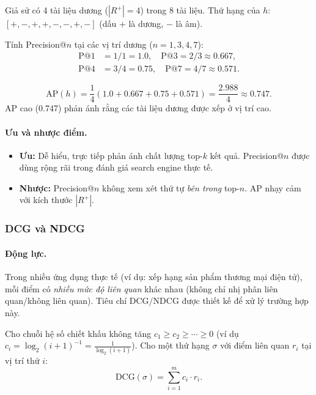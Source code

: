 \begin{example}
Giả sử có 4 tài liệu dương ($|R^+| = 4$) trong 8 tài liệu. Thứ hạng của $h$: $[+, -, +, +, -, -, +, -]$ (dấu $+$ là dương, $-$ là âm).

Tính Precision@$n$ tại các vị trí dương ($n = 1, 3, 4, 7$):
\begin{align*}
    \mathrm{P@1} &= 1/1 = 1.0, \quad \mathrm{P@3} = 2/3 \approx 0.667, \\
    \mathrm{P@4} &= 3/4 = 0.75, \quad \mathrm{P@7} = 4/7 \approx 0.571.
\end{align*}

\[
    \mathrm{AP}(h) = \frac{1}{4}(1.0 + 0.667 + 0.75 + 0.571) = \frac{2.988}{4} \approx 0.747.
\]
AP cao (0.747) phản ánh rằng các tài liệu dương được xếp ở vị trí cao.
\end{example}

\paragraph{Ưu và nhược điểm.}
\begin{itemize}
    \item \textbf{Ưu:} Dễ hiểu, trực tiếp phản ánh chất lượng top-$k$ kết quả. Precision@$n$ được dùng rộng rãi trong đánh giá search engine thực tế.
    \item \textbf{Nhược:} Precision@$n$ không xem xét thứ tự \emph{bên trong} top-$n$. AP nhạy cảm với kích thước $|R^+|$.
\end{itemize}

\subsubsection{DCG và NDCG}
\label{sec:dcg_ndcg}

\paragraph{Động lực.}
Trong nhiều ứng dụng thực tế (ví dụ: xếp hạng sản phẩm thương mại điện tử), mỗi điểm có \emph{nhiều mức độ liên quan} khác nhau (không chỉ nhị phân liên quan/không liên quan). Tiêu chí DCG/NDCG được thiết kế để xử lý trường hợp này.

\begin{definition}
Cho chuỗi hệ số chiết khấu không tăng $c_1 \geq c_2 \geq \cdots \geq 0$ (ví dụ $c_i = \log_2(i+1)^{-1} = \frac{1}{\log_2(i+1)}$). Cho một thứ hạng $\sigma$ với điểm liên quan $r_i$ tại vị trí thứ $i$:
\begin{equation}
    \mathrm{DCG}(\sigma) = \sum_{i=1}^{m} c_i \cdot r_i.
    \label{eq:dcg}
\end{equation}
\end{definition}


